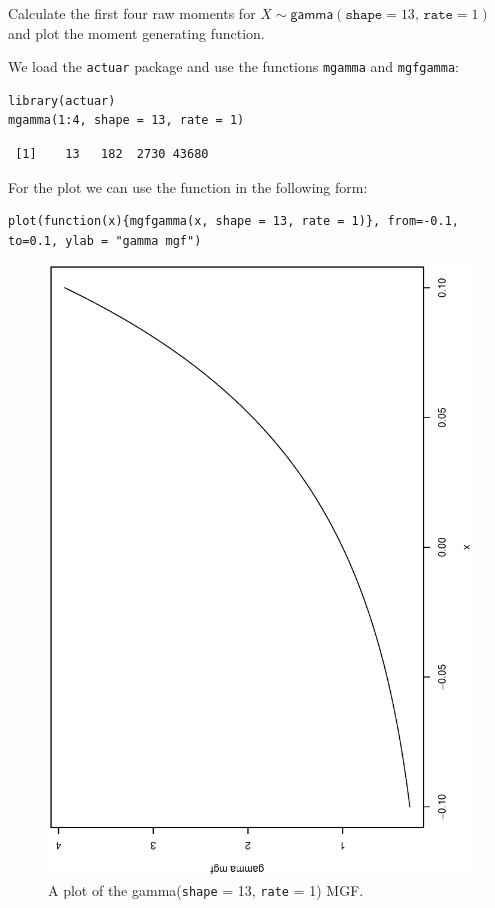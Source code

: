 \documentclass[captions=tableheading]{scrbook}
\begin{document}
\begin{example}
Calculate the first four raw moments for \(X\sim\mathsf{gamma}(\mathtt{shape}=13,\,\mathtt{rate}=1)\) and plot the moment generating function.

We load the \texttt{actuar} package and use the functions \texttt{mgamma} and \texttt{mgfgamma}:

\lstset{language=R}
\begin{lstlisting}
library(actuar)
mgamma(1:4, shape = 13, rate = 1)
\end{lstlisting}

\begin{verbatim}
 [1]    13   182  2730 43680
\end{verbatim}

For the plot we can use the function in the following form:


\lstset{language=R}
\begin{lstlisting}
plot(function(x){mgfgamma(x, shape = 13, rate = 1)}, from=-0.1, to=0.1, ylab = "gamma mgf")
\end{lstlisting}





\begin{figure}[th]
  \includegraphics[angle=270, totalheight=4in]{ps/contdist/gamma-mgf.ps}
  \caption[Plot of the \textsf{gamma}(\texttt{shape} = 13, \texttt{rate} = 1) MGF]{\small A plot of the \textsf{gamma}(\texttt{shape} = 13, \texttt{rate} = 1) MGF.}
  \label{fig-gamma-mgf}
\end{figure}



\end{example}
\end{document}

